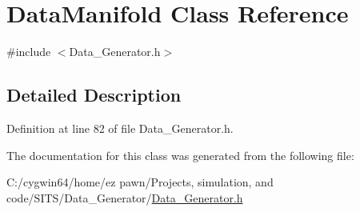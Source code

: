 \hypertarget{class_data_manifold}{}\section{Data\+Manifold Class Reference}
\label{class_data_manifold}


{\ttfamily \#include $<$Data\+\_\+\+Generator.\+h$>$}



\subsection{Detailed Description}


Definition at line 82 of file Data\+\_\+\+Generator.\+h.



The documentation for this class was generated from the following file\+:\begin{DoxyCompactItemize}
\item 
C\+:/cygwin64/home/ez pawn/\+Projects, simulation, and code/\+S\+I\+T\+S/\+Data\+\_\+\+Generator/\hyperlink{_data___generator_8h}{Data\+\_\+\+Generator.\+h}\end{DoxyCompactItemize}
